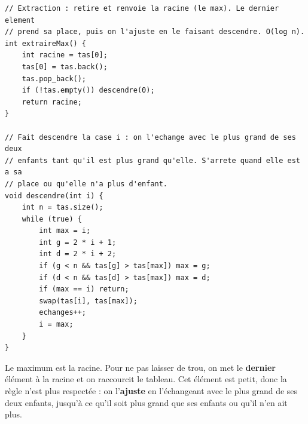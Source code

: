 \documentclass[11pt,a4paper]{article}
\begin{document}
\begin{lstlisting}[caption={Extraction du maximum (\texttt{extraireMax} et \texttt{descendre}).}]
// Extraction : retire et renvoie la racine (le max). Le dernier element
// prend sa place, puis on l'ajuste en le faisant descendre. O(log n).
int extraireMax() {
    int racine = tas[0];
    tas[0] = tas.back();
    tas.pop_back();
    if (!tas.empty()) descendre(0);
    return racine;
}

// Fait descendre la case i : on l'echange avec le plus grand de ses deux
// enfants tant qu'il est plus grand qu'elle. S'arrete quand elle est a sa
// place ou qu'elle n'a plus d'enfant.
void descendre(int i) {
    int n = tas.size();
    while (true) {
        int max = i;
        int g = 2 * i + 1;
        int d = 2 * i + 2;
        if (g < n && tas[g] > tas[max]) max = g;
        if (d < n && tas[d] > tas[max]) max = d;
        if (max == i) return;
        swap(tas[i], tas[max]);
        echanges++;
        i = max;
    }
}
\end{lstlisting}

Le maximum est la racine. Pour ne pas laisser de trou, on met le \textbf{dernier} élément
à la racine et on raccourcit le tableau. Cet élément est petit, donc la règle n'est plus
respectée : on l'\textbf{ajuste} en l'échangeant avec le plus grand de ses deux enfants,
jusqu'à ce qu'il soit plus grand que ses enfants ou qu'il n'en ait plus.
\end{document}

